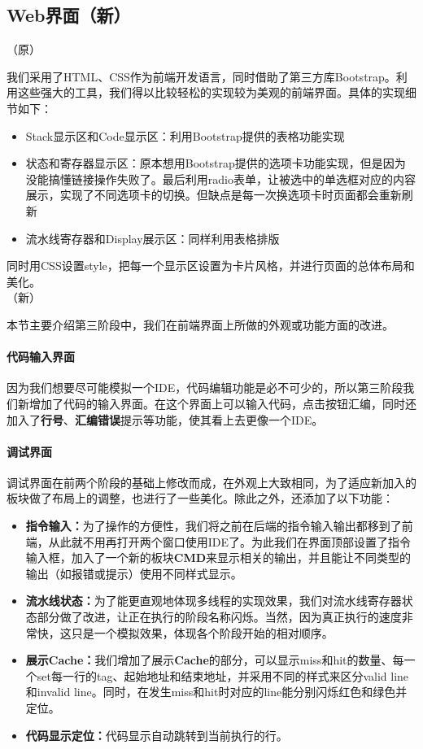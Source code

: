 \documentclass[a4paper,11pt,UTF8]{ctexart}
\begin{document}
\begin{sloppypar}
\subsection{{\bf Web界面（新）}}

（原）

我们采用了HTML、CSS作为前端开发语言，同时借助了第三方库Bootstrap。利用这些强大的工具，我们得以比较轻松的实现较为美观的前端界面。具体的实现细节如下：

\begin{itemize}
\item Stack显示区和Code显示区：利用Bootstrap提供的表格功能实现
\item 状态和寄存器显示区：原本想用Bootstrap提供的选项卡功能实现，但是因为没能搞懂链接操作失败了。最后利用radio表单，让被选中的单选框对应的内容展示，实现了不同选项卡的切换。但缺点是每一次换选项卡时页面都会重新刷新
\item 流水线寄存器和Display展示区：同样利用表格排版
\end{itemize}

同时用CSS设置style，把每一个显示区设置为卡片风格，并进行页面的总体布局和美化。\\

（新）

本节主要介绍第三阶段中，我们在前端界面上所做的外观或功能方面的改进。
\paragraph{代码输入界面} 

因为我们想要尽可能模拟一个IDE，代码编辑功能是必不可少的，所以第三阶段我们新增加了代码的输入界面。在这个界面上可以输入代码，点击按钮汇编，同时还加入了{\bf 行号}、{\bf 汇编错误}提示等功能，使其看上去更像一个IDE。

\paragraph{调试界面}

调试界面在前两个阶段的基础上修改而成，在外观上大致相同，为了适应新加入的板块做了布局上的调整，也进行了一些美化。除此之外，还添加了以下功能：
\begin{itemize}
\item {\bf 指令输入：}为了操作的方便性，我们将之前在后端的指令输入输出都移到了前端，从此就不用再打开两个窗口使用IDE了。为此我们在界面顶部设置了指令输入框，加入了一个新的板块{\bf CMD}来显示相关的输出，并且能让不同类型的输出（如报错或提示）使用不同样式显示。
\item {\bf 流水线状态：}为了能更直观地体现多线程的实现效果，我们对流水线寄存器状态部分做了改进，让正在执行的阶段名称闪烁。当然，因为真正执行的速度非常快，这只是一个模拟效果，体现各个阶段开始的相对顺序。
\item {\bf 展示Cache：}我们增加了展示{\bf Cache}的部分，可以显示miss和hit的数量、每一个set每一行的tag、起始地址和结束地址，并采用不同的样式来区分valid line和invalid line。同时，在发生miss和hit时对应的line能分别闪烁红色和绿色并定位。
\item {\bf 代码显示定位：}代码显示自动跳转到当前执行的行。
\end{itemize}



\end{sloppypar}
\end{document}
